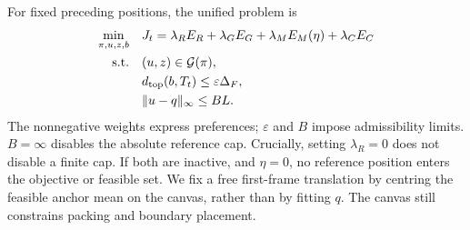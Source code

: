 For fixed preceding positions, the unified problem is
\begin{equation}
\begin{aligned}
 \min_{\pi,u,z,b}\quad &J_t=\lambda_RE_R+\lambda_GE_G+\lambda_ME_M(\eta)+\lambda_CE_C\\
 \text{s.t.}\quad &(u,z)\in\mathcal G(\pi),\\
 &d_{\rm top}(b,T_t)\le\varepsilon\Delta_F,\\
 &\|u-q\|_\infty\le BL .
\end{aligned}\label{eq:family}
\end{equation}
The nonnegative weights express preferences; $\varepsilon$ and $B$ impose admissibility limits. $B=\infty$ disables the absolute reference cap. Crucially, setting $\lambda_R=0$ does not disable a finite cap. If both are inactive, and $\eta=0$, no reference position enters the objective or feasible set. We fix a free first-frame translation by centring the feasible anchor mean on the canvas, rather than by fitting $q$. The canvas still constrains packing and boundary placement.

